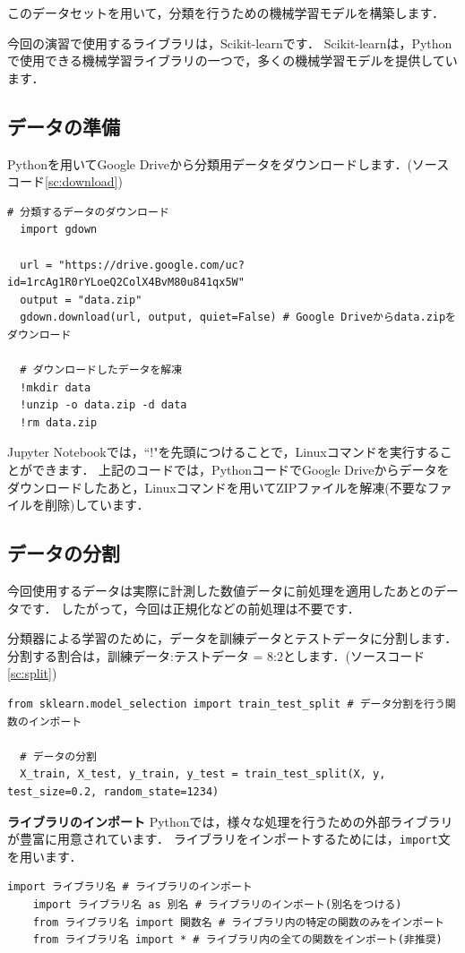 \documentclass{jarticle}
\begin{document}
このデータセットを用いて，分類を行うための機械学習モデルを構築します．

今回の演習で使用するライブラリは，Scikit-learnです．
Scikit-learnは，Pythonで使用できる機械学習ライブラリの一つで，多くの機械学習モデルを提供しています．


\subsection{データの準備}
Pythonを用いてGoogle Driveから分類用データをダウンロードします．(ソースコード\ref{sc:download})

\begin{lstlisting}[caption=データのダウンロード, label=sc:download]
  # 分類するデータのダウンロード
  import gdown

  url = "https://drive.google.com/uc?id=1rcAg1R0rYLoeQ2ColX4BvM80u841qx5W"
  output = "data.zip"
  gdown.download(url, output, quiet=False) # Google Driveからdata.zipをダウンロード

  # ダウンロードしたデータを解凍
  !mkdir data
  !unzip -o data.zip -d data
  !rm data.zip
\end{lstlisting}

Jupyter Notebookでは，``!"を先頭につけることで，Linuxコマンドを実行することができます．
上記のコードでは，PythonコードでGoogle Driveからデータをダウンロードしたあと，Linuxコマンドを用いてZIPファイルを解凍(不要なファイルを削除)しています．

\subsection{データの分割}
今回使用するデータは実際に計測した数値データに前処理を適用したあとのデータです．
したがって，今回は正規化などの前処理は不要です．

分類器による学習のために，データを訓練データとテストデータに分割します．
分割する割合は，訓練データ:テストデータ = 8:2とします．(ソースコード\ref{sc:split})

\begin{lstlisting}[caption=データの分割, label=sc:split]
  from sklearn.model_selection import train_test_split # データ分割を行う関数のインポート

  # データの分割
  X_train, X_test, y_train, y_test = train_test_split(X, y, test_size=0.2, random_state=1234)
\end{lstlisting}

\begin{itembox}[l]{\textbf{ライブラリのインポート}}
  Pythonでは，様々な処理を行うための外部ライブラリが豊富に用意されています．
  ライブラリをインポートするためには，\texttt{import}文を用います．

  \begin{lstlisting}[caption={ライブラリのインポート}]
    import ライブラリ名 # ライブラリのインポート
    import ライブラリ名 as 別名 # ライブラリのインポート(別名をつける)
    from ライブラリ名 import 関数名 # ライブラリ内の特定の関数のみをインポート
    from ライブラリ名 import * # ライブラリ内の全ての関数をインポート(非推奨)
  \end{lstlisting}

\end{itembox}
\end{document}
